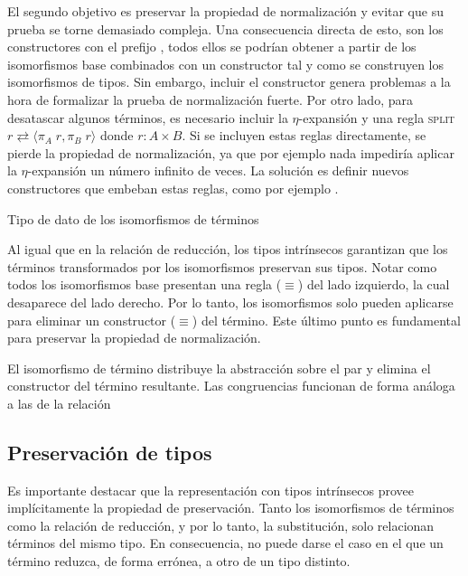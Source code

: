 El segundo objetivo es preservar la propiedad de normalización y evitar que su prueba se torne demasiado compleja.
Una consecuencia directa de esto, son los constructores con el prefijo , todos ellos se podrían obtener a partir de los isomorfismos base combinados con un constructor  tal y como se construyen los isomorfismos de tipos.
Sin embargo, incluir el constructor  genera problemas a la hora de formalizar la prueba de normalización fuerte.
Por otro lado, para desatascar algunos términos, es necesario incluir la $\eta$-expansión y una regla \textsc{split} $r \rightleftarrows \langle \pi_A\; r , \pi_B\; r \rangle$ donde $r: A \times B$.
Si se incluyen estas reglas directamente, se pierde la propiedad de normalización, ya que por ejemplo nada impediría aplicar la $\eta$-expansión un número infinito de veces.
La solución es definir nuevos constructores que embeban estas reglas, como por ejemplo .


\begin{codigo}
	Tipo de dato de los isomorfismos de términos
	
\end{codigo}

Al igual que en la relación de reducción, los tipos intrínsecos garantizan que los términos transformados por los isomorfismos preservan sus tipos.
Notar como todos los isomorfismos base presentan una regla ($\equiv$) del lado izquierdo, la cual desaparece del lado derecho.
Por lo tanto, los isomorfismos solo pueden aplicarse para eliminar un constructor ($\equiv$) del término.
Este último punto es fundamental para preservar la propiedad de normalización.

\begin{example}
	El isomorfismo de término  distribuye la abstracción sobre el par y elimina el constructor  del término resultante.
	Las congruencias funcionan de forma análoga a las de la relación \type{$\_\hookrightarrow\_$}
\end{example}

\subsection{Preservación de tipos}

Es importante destacar que la representación con tipos intrínsecos provee implícitamente la propiedad de preservación.
Tanto los isomorfismos de términos como la relación de reducción, y por lo tanto, la substitución, solo relacionan términos del mismo tipo.
En consecuencia, no puede darse el caso en el que un término reduzca, de forma errónea, a otro de un tipo distinto.


